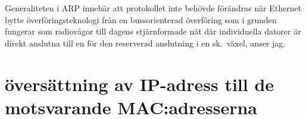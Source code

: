 \documentclass[swedish,10pt,a4paper]{report}
\begin{document}
Generaliteten i ARP innebär att protokollet inte behövde förändras
när Ethernet bytte överföringsteknologi från en bussorienterad överföring
som i grunden fungerar som radiovågor till dagens stjärnformade nät där individuella datorer är
direkt anslutna till en för den reserverad anslutning i en sk.\ växel, anser jag.


\chapter{översättning av IP-adress till de motsvarande MAC:adresserna}\label{sect:trans_ip_mac}


\end{document}
